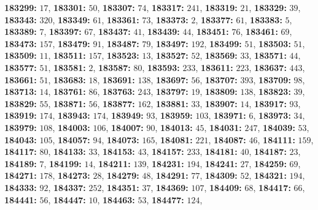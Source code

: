 \textsf{\bfseries 183299:} $17$, \textsf{\bfseries 183301:} $50$, \textsf{\bfseries 183307:} $74$, \textsf{\bfseries 183317:} $241$, \textsf{\bfseries 183319:} $21$, \textsf{\bfseries 183329:} $39$, \textsf{\bfseries 183343:} $320$, \textsf{\bfseries 183349:} $61$, \textsf{\bfseries 183361:} $73$, \textsf{\bfseries 183373:} $2$, \textsf{\bfseries 183377:} $61$, \textsf{\bfseries 183383:} $5$, \textsf{\bfseries 183389:} $7$, \textsf{\bfseries 183397:} $67$, \textsf{\bfseries 183437:} $41$, \textsf{\bfseries 183439:} $44$, \textsf{\bfseries 183451:} $76$, \textsf{\bfseries 183461:} $69$, \textsf{\bfseries 183473:} $157$, \textsf{\bfseries 183479:} $91$, \textsf{\bfseries 183487:} $79$, \textsf{\bfseries 183497:} $192$, \textsf{\bfseries 183499:} $51$, \textsf{\bfseries 183503:} $51$, \textsf{\bfseries 183509:} $11$, \textsf{\bfseries 183511:} $157$, \textsf{\bfseries 183523:} $13$, \textsf{\bfseries 183527:} $52$, \textsf{\bfseries 183569:} $33$, \textsf{\bfseries 183571:} $44$, \textsf{\bfseries 183577:} $51$, \textsf{\bfseries 183581:} $2$, \textsf{\bfseries 183587:} $80$, \textsf{\bfseries 183593:} $233$, \textsf{\bfseries 183611:} $223$, \textsf{\bfseries 183637:} $443$, \textsf{\bfseries 183661:} $51$, \textsf{\bfseries 183683:} $18$, \textsf{\bfseries 183691:} $138$, \textsf{\bfseries 183697:} $56$, \textsf{\bfseries 183707:} $393$, \textsf{\bfseries 183709:} $98$, \textsf{\bfseries 183713:} $14$, \textsf{\bfseries 183761:} $86$, \textsf{\bfseries 183763:} $243$, \textsf{\bfseries 183797:} $19$, \textsf{\bfseries 183809:} $138$, \textsf{\bfseries 183823:} $39$, \textsf{\bfseries 183829:} $55$, \textsf{\bfseries 183871:} $56$, \textsf{\bfseries 183877:} $162$, \textsf{\bfseries 183881:} $33$, \textsf{\bfseries 183907:} $14$, \textsf{\bfseries 183917:} $93$, \textsf{\bfseries 183919:} $174$, \textsf{\bfseries 183943:} $174$, \textsf{\bfseries 183949:} $93$, \textsf{\bfseries 183959:} $103$, \textsf{\bfseries 183971:} $6$, \textsf{\bfseries 183973:} $34$, \textsf{\bfseries 183979:} $108$, \textsf{\bfseries 184003:} $106$, \textsf{\bfseries 184007:} $90$, \textsf{\bfseries 184013:} $45$, \textsf{\bfseries 184031:} $247$, \textsf{\bfseries 184039:} $53$, \textsf{\bfseries 184043:} $105$, \textsf{\bfseries 184057:} $94$, \textsf{\bfseries 184073:} $165$, \textsf{\bfseries 184081:} $221$, \textsf{\bfseries 184087:} $46$, \textsf{\bfseries 184111:} $159$, \textsf{\bfseries 184117:} $80$, \textsf{\bfseries 184133:} $33$, \textsf{\bfseries 184153:} $43$, \textsf{\bfseries 184157:} $233$, \textsf{\bfseries 184181:} $40$, \textsf{\bfseries 184187:} $23$, \textsf{\bfseries 184189:} $7$, \textsf{\bfseries 184199:} $14$, \textsf{\bfseries 184211:} $139$, \textsf{\bfseries 184231:} $194$, \textsf{\bfseries 184241:} $27$, \textsf{\bfseries 184259:} $69$, \textsf{\bfseries 184271:} $178$, \textsf{\bfseries 184273:} $28$, \textsf{\bfseries 184279:} $48$, \textsf{\bfseries 184291:} $77$, \textsf{\bfseries 184309:} $52$, \textsf{\bfseries 184321:} $194$, \textsf{\bfseries 184333:} $92$, \textsf{\bfseries 184337:} $252$, \textsf{\bfseries 184351:} $37$, \textsf{\bfseries 184369:} $107$, \textsf{\bfseries 184409:} $68$, \textsf{\bfseries 184417:} $66$, \textsf{\bfseries 184441:} $56$, \textsf{\bfseries 184447:} $10$, \textsf{\bfseries 184463:} $53$, \textsf{\bfseries 184477:} $124$, 

